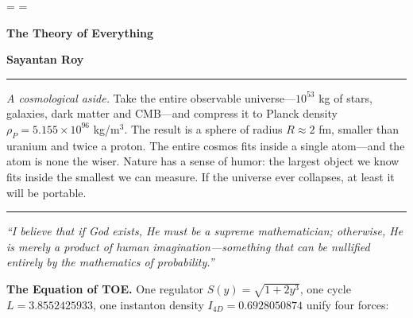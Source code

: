 \documentclass[a4paper,1pt,oneside,openany]{book}
\begin{document}
\pagestyle{plain}
\sloppy
\hfuzz=\maxdimen
\vfuzz=\maxdimen

\begin{titlepage}
\centering
{}

\vspace*{1.2cm}

{\Huge\bfseries The Theory of Everything\par}
\vspace{0.3cm}


\vspace{0.8cm}
{\Large\bfseries Sayantan Roy\par}

\vspace{0.8cm}
\rule{0.7\textwidth}{0.6pt}

\vspace{0.8cm}
\begin{minipage}{0.82\textwidth}
\centering
\footnotesize\textit{A cosmological aside.} Take the entire observable universe---$10^{53}$ kg of stars, galaxies, dark matter and CMB---and compress it to Planck density $\rho_P=5.155\times10^{96}$ kg/m$^3$. The result is a sphere of radius $R\approx2$ fm, smaller than uranium and twice a proton. The entire cosmos fits inside a single atom---and the atom is none the wiser. Nature has a sense of humor: the largest object we know fits inside the smallest we can measure. If the universe ever collapses, at least it will be portable.
\end{minipage}
\vspace{0.8cm}
\rule{0.7\textwidth}{0.6pt}

\vspace{0.8cm}
\begin{minipage}{0.8\textwidth}
\centering
\small\itshape
``I believe that if God exists, He must be a supreme mathematician; otherwise, He is merely a product of human imagination---something that can be nullified entirely by the mathematics of probability.''
\end{minipage}

\vspace{1.0cm}

\begin{minipage}{0.88\textwidth}
\centering
\small
\textbf{The Equation of TOE.} One regulator $S(y)=\sqrt{1+2y^3}$, one cycle $L=3.8552425933$, one instanton density $I_{4D}=0.6928050874$ unify four forces:


\end{minipage}
\end{titlepage}
\end{document}
